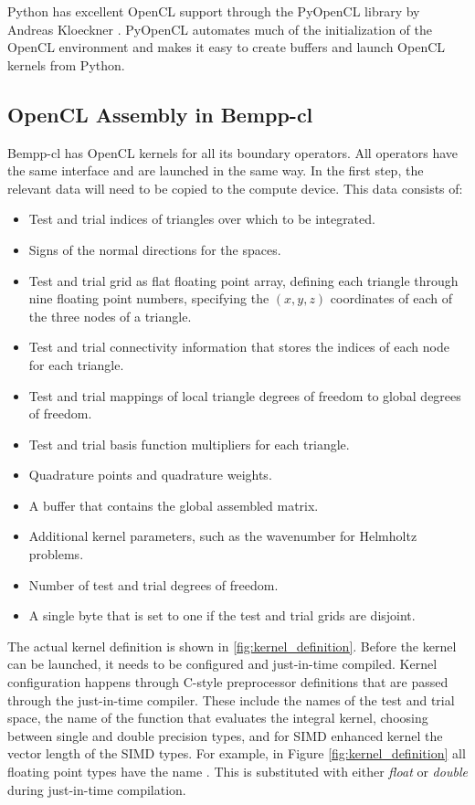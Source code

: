 Python has excellent OpenCL support through the PyOpenCL library by Andreas Kloeckner \cite{pyopencl}. PyOpenCL automates much of the initialization of the OpenCL environment and makes it easy to create buffers and launch OpenCL kernels from Python.

\subsection{OpenCL Assembly in Bempp-cl}

\begin{figure*}
	\center
	
	\caption{Definition of the OpenCL compute kernel for scalar integral equations.}
	\label{fig:kernel_definition}
\end{figure*}

Bempp-cl has OpenCL kernels for all its boundary operators. All operators have the same interface and are launched in the same way. In the first step, the relevant data will need to be copied to the compute device. This data consists of:

\begin{itemize}
	\item Test and trial indices of triangles over which to be integrated.
	\item Signs of the normal directions for the spaces.
	\item Test and trial grid as flat floating point array, defining each triangle through nine floating point numbers, specifying the $(x, y, z)$ coordinates of each of the three nodes of a triangle.
	\item Test and trial connectivity information that stores the indices of each node for each triangle.
	\item Test and trial mappings of local triangle degrees of freedom to global degrees of freedom.
	\item Test and trial basis function multipliers for each triangle.
	\item Quadrature points and quadrature weights.
	\item A buffer that contains the global assembled matrix.
	\item Additional kernel parameters, such as the wavenumber for Helmholtz problems.
	\item Number of test and trial degrees of freedom.
	\item A single byte that is set to one if the test and trial grids are disjoint.
\end{itemize}
The actual kernel definition is shown in \cref{fig:kernel_definition}.
Before the kernel can be launched, it needs to be configured and just-in-time compiled. Kernel configuration happens through C-style preprocessor definitions that are passed through the just-in-time compiler. These include the names of the test and trial space, the name of the function that evaluates the integral kernel, choosing between single and double precision types, and for SIMD enhanced kernel the vector length of the SIMD types.
For example, in Figure \ref{fig:kernel_definition} all floating point types have the name . This is substituted with either \textit{float} or \textit{double} during just-in-time compilation.

